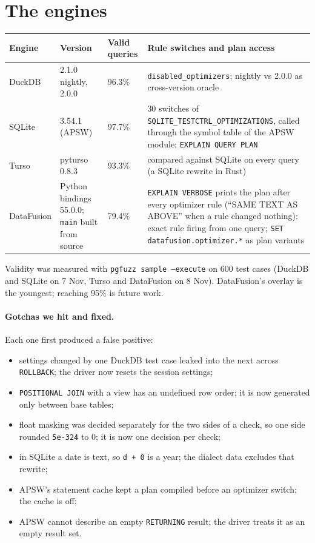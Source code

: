 \section{The engines}

\begin{center}
\small
\begin{tabularx}{\linewidth}{lllX}
\toprule
Engine & Version & Valid queries & Rule switches and plan access \\
\midrule
DuckDB & 2.1.0 nightly, 2.0.0 & 96.3\% & \texttt{disabled\_optimizers}; nightly vs 2.0.0 as cross-version oracle \\
SQLite & 3.54.1 (APSW) & 97.7\% & 30 switches of \texttt{SQLITE\_TESTCTRL\_OPTIMIZATIONS}, called through the symbol table of the APSW module; \texttt{EXPLAIN QUERY PLAN} \\
Turso & pyturso 0.8.3 & 93.3\% & compared against SQLite on every query (a SQLite rewrite in Rust) \\
DataFusion & Python bindings 55.0.0; \texttt{main} built from source & 79.4\% & \texttt{EXPLAIN VERBOSE} prints the plan after every optimizer rule (``SAME TEXT AS ABOVE'' when a rule changed nothing): exact rule firing from one query; \texttt{SET datafusion.optimizer.*} as plan variants \\
\bottomrule
\end{tabularx}
\end{center}

Validity was measured with \texttt{pgfuzz sample --execute} on 600 test cases
(DuckDB and SQLite on 7 Nov, Turso and DataFusion on 8 Nov). DataFusion's
overlay is the youngest; reaching 95\% is future work.

\paragraph{Gotchas we hit and fixed.} Each one first produced a false positive:
\begin{itemize}
  \item settings changed by one DuckDB test case leaked into the next across
    \texttt{ROLLBACK}; the driver now resets the session settings;
  \item \texttt{POSITIONAL JOIN} with a view has an undefined row order; it is now
    generated only between base tables;
  \item float masking was decided separately for the two sides of a check, so
    one side rounded \texttt{5e-324} to 0; it is now one decision per check;
  \item in SQLite a date is text, so \texttt{d + 0} is a year; the dialect data
    excludes that rewrite;
  \item APSW's statement cache kept a plan compiled before an optimizer switch;
    the cache is off;
  \item APSW cannot describe an empty \texttt{RETURNING} result; the driver
    treats it as an empty result set.
\end{itemize}

